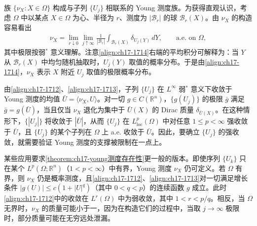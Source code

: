 \documentclass[../../main.tex]{subfiles}
\begin{document}
族 $\{\nu_X:X\in\Omega\}$ 构成与子列 $\{U_j\}$ 相联系的 Young 测度族。为获得直观认识，考虑 $\Omega$ 中以某点 $X\in\Omega$ 为心、半径为 $r$、测度为 $|\mathscr{B}_r|$ 的球 $\mathscr{B}_r(X)$。由 $\nu_X$ 的构造容易看出
\begin{align}
\nu_X=\lim_{r\downarrow0}\lim_{j\uparrow\infty}\frac{1}{|\mathscr{B}_r|}\int_{\mathscr{B}_r(X)}\delta_{U_j(Y)}\,dY,\qquad\text{a.e. on }\Omega,
\label{align:ch17-1714}
\end{align}
其中极限按弱$^*$ 意义理解。注意\eqref{align:ch17-1714}右端的平均积分可解释为：当 $Y$ 从 $\mathscr{B}_r(X)$ 中均匀随机抽取时，$U_j(Y)$ 取值的概率分布。于是由\eqref{align:ch17-1714}，$\nu_X$ 表示 $X$ 附近 $U_j$ 取值的极限概率分布。

由\eqref{align:ch17-1712}、\eqref{align:ch17-1713}，子列 $\{U_j\}$ 在 $L^\infty$ 弱$^*$ 意义下收敛于 Young 测度的均值 $\bar U=\langle\nu_X,U\rangle$。对一切 $g\in C(\mathbb{R}^n)$，$\{g(U_j)\}$ 的极限 $\bar g$ 满足 $\bar g=g(\bar U)$，当且仅当 $\nu_X$ 退化为集中于 $\bar U(X)$ 的 Dirac 质量 $\delta_{\bar U(X)}$。在这种情形下，$\{|U_j|\}$ 将收敛于 $|\bar U|$，从而 $\{U_j\}$ 在 $L^p_{\mathrm{loc}}(\Omega)$ 中对任意 $1\leqslant p<\infty$ 强收敛于 $\bar U$，且 $\{U_j\}$ 的某个子列在 $\Omega$ 上 a.e. 收敛于 $\bar U$。因此，要确立 $\{U_j\}$ 的强收敛，就需要验证 Young 测度的支撑被限制在一点上。

某些应用要求\cref{theorem:ch17-young测度存在性}更一般的版本。即使序列 $\{U_k\}$ 只在某个 $L^p(\Omega;\mathbb{R}^n)$（$1<p<\infty$）中有界，Young 测度 $\nu_X$ 仍可定义。若 $\Omega$ 有界，则 $\nu_X$ 仍是概率测度，且\eqref{align:ch17-1712}、\eqref{align:ch17-1713}对一切满足增长条件 $|g(U)|\leqslant c(1+|U|^q)$（其中 $0<q<p$）的连续函数 $g$ 成立。此时\eqref{align:ch17-1712}中的收敛在 $L^r(\Omega)$ 中为弱收敛，其中 $1<r<p/q$。相反，当 $\Omega$ 无界时，$\nu_X$ 的质量可能小于一，因为在构造它们的过程中，当取 $j\to\infty$ 极限时，部分质量可能在无穷远处泄漏。
\end{document}
